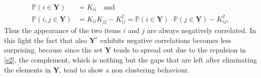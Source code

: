 \begin{equation}\label{e2}
\begin{split}
\mathbb P(i\in \mathbf Y) & = K_{ii} \quad \text{and} \\
\mathbb P(i,j\in\mathbf Y) & = K_{ii}K_{jj}-K_{ij}^2 = \mathbb P(i\in\mathbf Y)\cdot\mathbb P(j\in\mathbf Y)-K_{ij}^2,
\end{split}
\end{equation}
Thus the appearance of the two items \(i\) and \(j\) are always negatively correlated. In this light the fact that also \(\mathbf Y^c\) exhibits negative correlations becomes less surprising, because since the set \(\mathbf Y\) tends to spread out due to the repulsion in \eqref{e2}, the complement, which is nothing but the gaps that are left after eliminating the elements in \(\mathbf Y\), tend to show a non clustering behaviour.

